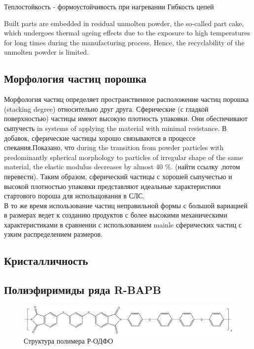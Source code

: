 Теплостойкость - формоустойчивость при нагревании
Гибкость цепей

Built parts are embedded in residual unmolten powder, the so-called part cake, which undergoes
thermal ageing effects due to the exposure to high temperatures for long times during the manufacturing process. Hence, the
recyclability of the unmolten powder is limited. \cite{ageing}


\subsection{Морфология частиц порошка}
Морфология частиц определяет пространственное расположение частиц порошка (stacking degree) относительно друг друга. Сферические (с гладкой поверхностью) частицы имеют высокую плотность упаковки. Они обеспечивают  сыпучесть in systems of applying the material with minimal resistance. В добавок, сферические частицы хорошо связываются в процессе спекания.Показано, что 
during the transition from powder particles with predominantly spherical morphology to particles of irregular shape of the same material, the elastic modulus decreases by almost 40 \%. 
(найти ссылку ,потом перевести).
Таким образом, сферический частицы с хорошей сыпучестью и высокой плотностью упаковки представляют идеальные характеристики стартового пороша для испольщования в СЛС.\\
В то же время использование частиц неправильной формы с большой вариацией в размерах ведет к созданию продуктов с более высокими механическими характеристиками в сравнении с использованием mainle сферических частиц с узким распределением размеров.

\subsection{Кристалличность}

\subsection{Полиэфиримиды ряда R-BAPB }
		
	\begin{figure}[h]
	\includegraphics[width=\textwidth]{fig/formula.png}
	\caption{Структура полимера Р-ОДФО \cite{pi-formula}}
	\label{fig:formula}
	\end{figure}


